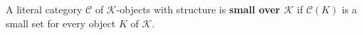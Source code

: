 A literal category $\mathcal{C}$ of $\mathcal{K}$-objects with structure is \textbf{small over $\mathcal{K}$} if $\mathcal{C}(K)$ is a small set for every object $K$ of $\mathcal{K}$.

